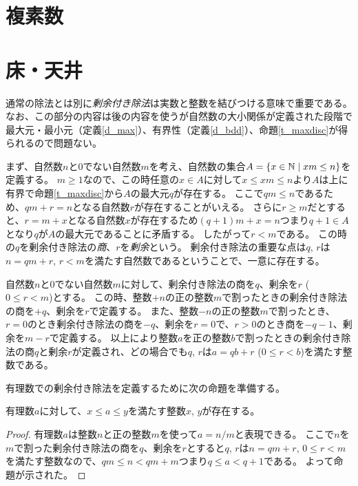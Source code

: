 \section{複素数}

\section{床・天井}

通常の除法とは別に\emph{剰余付き除法}は実数と整数を結びつける意味で重要である。
なお、この部分の内容は後の内容を使うが自然数の大小関係が定義された段階で最大元・最小元（定義\ref{d_max}）、有界性（定義\ref{d_bdd}）、命題\ref{t_maxdisc}が得られるので問題ない。

まず、自然数$n$と$0$でない自然数$m$を考え、自然数の集合$A = \{ x \in \mathbb{N} \mid x m \le n \}$を定義する。
$m \ge 1$なので、この時任意の$x \in A$に対して$x \le x m \le n$より$A$は上に有界で命題\ref{t_maxdisc}から$A$の最大元$q$が存在する。
ここで$q m \le n$であるため、$q m+r = n$となる自然数$r$が存在することがいえる。
さらに$r \ge m$だとすると、$r = m+x$となる自然数$x$が存在するため$(q+1) m+x = n$つまり$q+1 \in A$となり$q$が$A$の最大元であることに矛盾する。
したがって$r < m$である。
この時の$q$を剰余付き除法の\emph{商}、$r$を\emph{剰余}という。
剰余付き除法の重要な点は$q$, $r$は$n = q m+r$, $r < m$を満たす自然数であるということで、一意に存在する。

自然数$n$と$0$でない自然数$m$に対して、剰余付き除法の商を$q$、剰余を$r$ ($0 \le r < m$)とする。
この時、整数$+n$の正の整数$m$で割ったときの剰余付き除法の商を$+q$、剰余を$r$で定義する。
また、整数$-n$の正の整数$m$で割ったとき、$r = 0$のとき剰余付き除法の商を$-q$、剰余を$r = 0$で、$r > 0$のとき商を$-q-1$、剰余を$m-r$で定義する。
以上により整数$a$を正の整数$b$で割ったときの剰余付き除法の商$q$と剰余$r$が定義され、どの場合でも$q$, $r$は$a = q b+r$ ($0 \le r < b$)を満たす整数である。

有理数での剰余付き除法を定義するために次の命題を準備する。

\begin{proposition}
\label{t_int_rational}
有理数$a$に対して、$x \le a \le y$を満たす整数$x$, $y$が存在する。
\end{proposition}

\begin{proof}
有理数$a$は整数$n$と正の整数$m$を使って$a = n/m$と表現できる。
ここで$n$を$m$で割った剰余付き除法の商を$q$、剰余を$r$とすると$q$, $r$は$n = q m+r$, $0 \le r < m$を満たす整数なので、$q m \le n < q m+m$つまり$q \le a < q+1$である。
よって命題が示された。
\end{proof}

